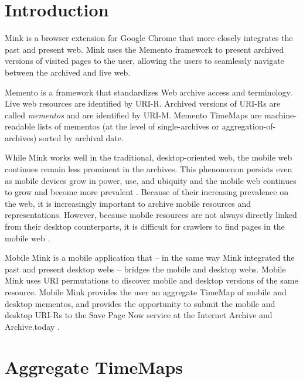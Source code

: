 \documentclass{sig-alternate}
\begin{document}
\section{Introduction}
\label{introduction}
Mink \cite{mink} is a browser extension for Google Chrome that more closely integrates the past and present web. Mink uses the Memento framework \cite{nelson:memento:tr} to present archived versions of visited pages to the user, allowing the users to seamlessly navigate between the archived and live web.

Memento is a framework that standardizes Web archive access and terminology. Live web resources are identified by URI-R. Archived versions of URI-Rs are called \emph{mementos} and are identified by URI-M. Memento TimeMaps are machine-readable lists of mementos (at the level of single-archives or aggregation-of-archives) sorted by archival date.

While Mink works well in the traditional, desktop-oriented web, the mobile web continues remain less prominent in the archives. This phenomenon persists even as mobile devices grow in power, use, and ubiquity and the mobile web continues to grow and become more prevalent \cite{mobileWeb}. Because of their increasing prevalence on the web, it is increasingly important to archive mobile resources and representations. However, because mobile resources are not always directly linked from their desktop counterparts, it is difficult for crawlers to find pages in the mobile web \cite{4544648}.

Mobile Mink is a mobile application that -- in the same way Mink integrated the past and present desktop webs -- bridges the mobile and desktop webs. Mobile Mink uses URI permutations to discover mobile and desktop versions of the same resource. Mobile Mink provides the user an aggregate TimeMap of mobile and desktop mementos, and provides the opportunity to submit the mobile and desktop URI-Rs to the Save Page Now service at the Internet Archive \cite{savePage} and Archive.today \cite{archivetoday}.


\section{Aggregate TimeMaps}
\label{timemaps}
\end{document}
